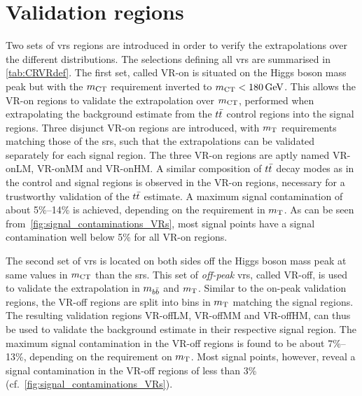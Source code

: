 \section{Validation regions}


Two sets of \glspl{vr} regions are introduced in order to verify the extrapolations over the different distributions. The selections defining all \glspl{vr} are summarised in \cref{tab:CRVRdef}. The first set, called VR-on is situated on the Higgs boson mass peak but with the $m_{\textrm{CT}}$ requirement inverted to $\mct<\SI{180}{\GeV}$. This allows the VR-on regions to validate the extrapolation over $m_{\textrm{CT}}$, performed when extrapolating the background estimate from the $t\bar{t}$ control regions into the signal regions. Three disjunct VR-on regions are introduced, with $m_{\textrm{T}}$ requirements matching those of the \glspl{sr}, such that the extrapolations can be validated separately for each signal region. The three VR-on regions are aptly named VR-onLM, VR-onMM and VR-onHM. A similar composition of $t\bar{t}$ decay modes as in the control and signal regions is observed in the VR-on regions, necessary for a trustworthy validation of the $t\bar{t}$ estimate. A maximum signal contamination of about 5\%--14\% is achieved, depending on the requirement in $m_{\textrm{T}}$. As can be seen from~\cref{fig:signal_contaminations_VRs}, most signal points have a signal contamination well below 5\% for all VR-on regions.  

 The second set of \glspl{vr} is located on both sides off the Higgs boson mass peak at same values in $m_{\textrm{CT}}$ than the \glspl{sr}. This set of \textit{off-peak} \glspl{vr}, called VR-off, is used to validate the extrapolation in $m_{b\bar{b}}$ and $m_{\textrm{T}}$. Similar to the on-peak validation regions, the VR-off regions are split into bins in $m_{\textrm{T}}$ matching the signal regions. The resulting validation regions VR-offLM, VR-offMM and VR-offHM, can thus be used to validate the background estimate in their respective signal region. The maximum signal contamination in the VR-off regions is found to be about 7\%--13\%, depending on the requirement on $m_{\textrm{T}}$. Most signal points, however, reveal a signal contamination in the VR-off regions of less than 3\% (cf.~\cref{fig:signal_contaminations_VRs}).


